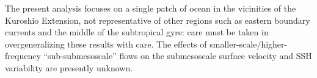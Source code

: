 \documentclass[grl]{agutex2015}
\begin{document}
\begin{article}
The present analysis focuses on a single patch of ocean in the
vicinities of the Kuroshio Extension, not
representative of other regions such as eastern boundary currents
and the middle of the subtropical gyre: care must be taken in overgeneralizing
these results with care.  The effects of smaller-scale/higher-frequency
``sub-submesoscale'' flows on the submesoscale surface velocity and SSH variability
are presently unknown.




%
%
%
%
%
%
%


\end{article}
\end{document}
